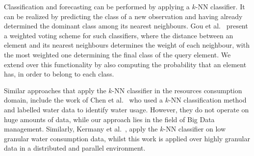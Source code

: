 Classification and forecasting can be performed by applying a $k$-NN classifier. It can be realized by predicting the class of a new observation and having already determined the dominant class among its nearest neighbours. Gou et al.~\cite{Gou2011jcp} present a weighted voting scheme for such classifiers, where the distance between an element and its nearest neighbours determines the weight of each neighbour, with the most weighted one determining the final class of the query element. We extend over this functionality by also computing the probability that an element has, in order to belong to each class.

Similar approaches that apply the $k$-NN classifier in the resources consumption domain, include the work of Chen et al.~\cite{chen2011aab} who used a $k$-NN classification method and labelled water data to identify water usage. However, they do not operate on huge amounts of data, while our approach lies in the field of Big Data management. Similarly, Kermany et al.~\cite{Kermany2013aam}, apply the $k$-NN classifier on low granular water consumption data, whilst this work is applied over highly granular data in a distributed and parallel environment.
